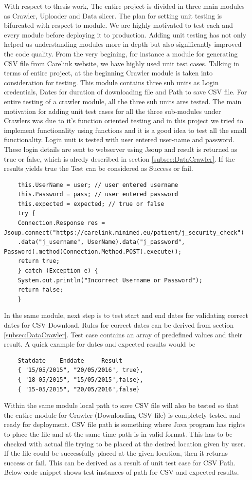 \documentclass[article,type=msc,colorback,accentcolor=tud9c,twoside,11pt]{tudthesis}
\begin{document}
	With respect to thesis work, The entire project is divided in three main modules as Crawler, Uploader and Data slicer. The plan for setting unit testing is bifurcated with respect to module. We are highly motivated to test each and every module before deploying it to production. Adding unit testing has not only helped us understanding modules more in depth but also significantly improved the code quality. From the very begining, for instance a module for generating CSV file from Carelink website, we have highly used unit test cases. Talking in terms of entire project, at the beginning Crawler module is taken into consideration for testing. This module contains three sub units as Login credentials, Dates for duration of downloading file and Path to save CSV file. For entire testing of a crawler module, all the three sub units ares tested. The main motivation for adding unit test cases for all the three sub-modules under Crawlers was due to it's function oriented testing and in this project we tried to implement functionality using functions and it is a good idea to test all the small functionality. Login unit is tested with user entered user-name and password. These login details are sent to webserver using Jsoup and result is returned as true or false, which is alredy described in section \ref{subsec:DataCrawler}. If the results yields  true the Test can be considered as Success or fail.
	\begin{lstlisting}
	this.UserName = user; // user entered username
	this.Password = pass; // user entered password
	this.expected = expected; // true or false
	try {
	Connection.Response res = Jsoup.connect("https://carelink.minimed.eu/patient/j_security_check")
	.data("j_username", UserName).data("j_password", Password).method(Connection.Method.POST).execute();
	return true;
	} catch (Exception e) {
	System.out.println("Incorrect Username or Password");
	return false;
	}
	\end{lstlisting}
	In the same module, next step is to test start and end dates for validating correct dates for CSV Download. Rules for correct dates can be derived from section \ref{subsec:DataCrawler}. Test case contains an array of predefined values and their result. A quick example for dates and expected results would be
	\begin{lstlisting}
	Statdate 	Enddate 	Result
	{ "15/05/2015", "20/05/2016", true},
	{ "18-05/2015", "15/05/2015",false},
	{ "15-05/2015", "20/05/2016",false}
	\end{lstlisting}
	Within the same module local path to save CSV file will also be tested so that the entire module for Crawler (Downloading CSV file) is completely tested and ready for deployment. CSV file path is something where Java program has rights to place the file and at the same time path is in valid format. This has to be checked with actual file trying to be placed at the desired location given by user. If the file could be successfully placed at the given location, then it returns success or fail. This can be derived as a result of unit test case for CSV Path. Below code snippet shows test instances of path for CSV and expected results.
\end{document}
